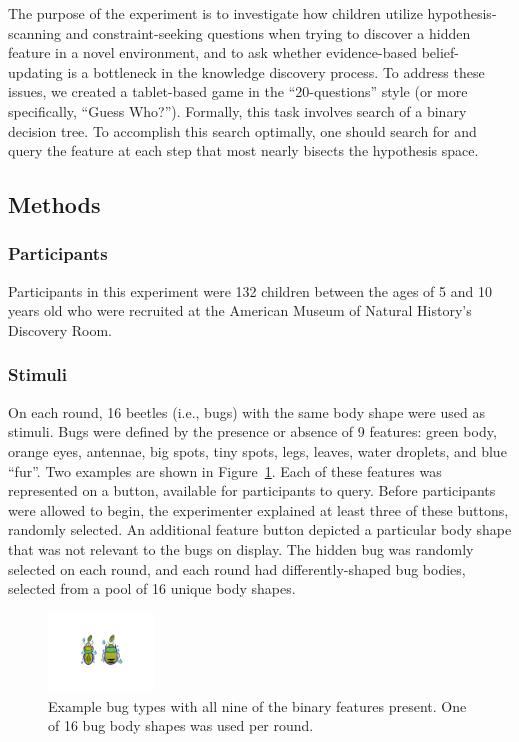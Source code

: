 \documentclass[10pt,letterpaper]{article}
\begin{document}
The purpose of the experiment is to investigate how children utilize hypothesis-scanning and constraint-seeking questions when trying to discover a hidden feature in a novel environment, and to ask whether evidence-based belief-updating is a bottleneck in the knowledge discovery process. To address these issues, we created a tablet-based game in the ``20-questions'' style (or more specifically, ``Guess Who?''). Formally, this task involves search of a binary decision tree. To accomplish this search optimally, one should search for and query the feature at each step that most nearly bisects the hypothesis space.

\subsection{Methods}

\subsubsection{Participants}

Participants in this experiment were 132 children between the ages of 5 and 10 years old who were recruited at the American Museum of Natural History's Discovery Room.

\subsubsection{Stimuli}

On each round, 16 beetles (i.e., bugs) with the same body shape were used as stimuli. Bugs were defined by the presence or absence of 9 features: green body, orange eyes, antennae, big spots, tiny spots, legs, leaves, water droplets, and blue ``fur''. Two examples are shown in Figure~\ref{fig:example_bugs}. Each of these features was represented on a button, available for participants to query. Before participants were allowed to begin, the experimenter explained at least three of these buttons, randomly selected. An additional feature button depicted a particular body shape that was not relevant to the bugs on display. The hidden bug was randomly selected on each round, and each round had differently-shaped bug bodies, selected from a pool of 16 unique body shapes.

\begin{figure}[!h]
  \centering
  \includegraphics[width=0.25\textwidth]{figures/example_bugs}
  \caption{Example bug types with all nine of the binary features present. One of 16 bug body shapes was used per round.}
  \label{fig:example_bugs}
\end{figure} 
\end{document}
